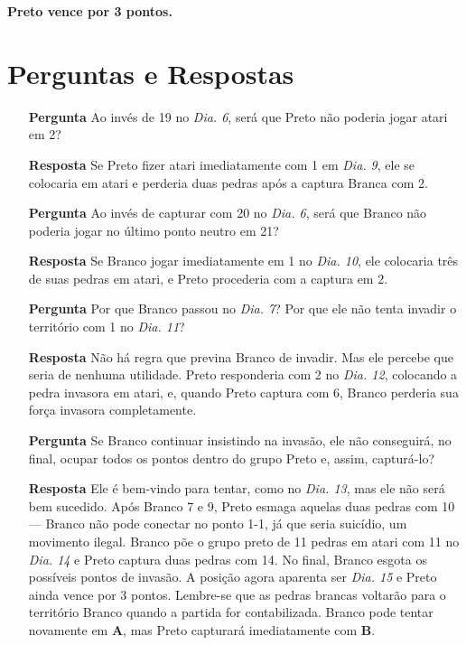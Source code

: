 \textbf{Preto vence por 3 pontos.}

\section{Perguntas e Respostas}

\begin{itemize}
    \item[\textbf{Pergunta}]
      Ao invés de 19 no \emph{Dia. 6}, será que Preto não poderia jogar atari em 2?
    \item[\textbf{Resposta}] 
      Se Preto fizer atari imediatamente com 1 em \emph{Dia. 9}, ele se colocaria em atari e perderia  duas pedras após a captura Branca com 2.
    \item[\textbf{Pergunta}]
      Ao invés de capturar com 20 no \emph{Dia. 6}, será que Branco não poderia jogar no último ponto neutro em 21?
    \item[\textbf{Resposta}] 
      Se Branco jogar imediatamente em 1 no \emph{Dia. 10}, ele colocaria três de suas pedras em atari, e Preto procederia com a captura em 2.
    \item[\textbf{Pergunta}]
      Por que Branco passou no \emph{Dia. 7}? Por que ele não tenta invadir o território com 1 no \emph{Dia. 11}?
    \item[\textbf{Resposta}] 
      Não há regra que previna Branco de invadir. Mas ele percebe que seria de nenhuma utilidade. Preto responderia com 2 no \emph{Dia. 12}, colocando a pedra invasora em atari, e, quando Preto captura com 6, Branco perderia sua força invasora completamente.
    \item[\textbf{Pergunta}]
      Se Branco continuar insistindo na invasão, ele não conseguirá, no final, ocupar todos os pontos dentro do grupo Preto e, assim, capturá-lo?
    \item[\textbf{Resposta}] 
      Ele é bem-vindo para tentar, como no \emph{Dia. 13}, mas ele não será bem sucedido. Após Branco 7 e 9, Preto esmaga aquelas duas pedras com 10 --- Branco não pode conectar no ponto 1-1, já que seria suicídio, um movimento ilegal. Branco põe o grupo preto de 11 pedras em atari com 11 no \emph{Dia. 14} e Preto captura duas pedras com 14. No final, Branco esgota os possíveis pontos de invasão. A posição agora aparenta ser \emph{Dia. 15} e Preto ainda vence por 3 pontos. Lembre-se que as pedras brancas voltarão para o território Branco quando a partida for contabilizada. Branco pode tentar novamente em \textbf{A}, mas Preto capturará imediatamente com \textbf{B}.
      

\end{itemize}
